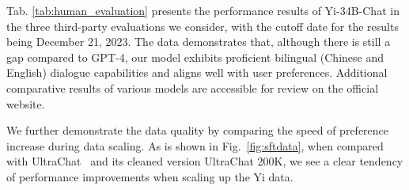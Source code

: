 \begin{table}[t!]
\centering
{}
\caption{Human evaluation comparison with other open-source chat models.}
\label{tab:human_evaluation}
\end{table}


Tab. \ref{tab:human_evaluation} presents the performance results of Yi-34B-Chat in the three third-party evaluations we consider, with the cutoff date for the results being December 21, 2023. The data demonstrates that, although there is still a gap compared to GPT-4, our model exhibits proficient bilingual (Chinese and English) dialogue capabilities and aligns well with user preferences. Additional comparative results of various models are accessible for review on the official website.


We further demonstrate the data quality by comparing the speed of preference increase during data scaling.
As is shown in Fig.~\ref{fig:sftdata}, when compared with UltraChat~\citep{ding2023enhancing} and its cleaned version UltraChat 200K, we see a clear tendency of performance improvements when scaling up the Yi data. 